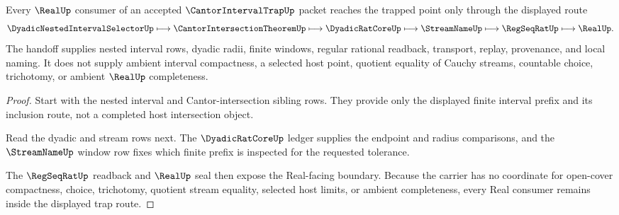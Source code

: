 \begin{theorem}
\label{thm:cantor-interval-trap-real-handoff}
Every $\RealUp$ consumer of an accepted $\CantorIntervalTrapUp$ packet reaches the trapped point only through the displayed route
$$
\DyadicNestedIntervalSelectorUp \longmapsto \CantorIntersectionTheoremUp \longmapsto \DyadicRatCoreUp \longmapsto \StreamNameUp \longmapsto \RegSeqRatUp \longmapsto \RealUp .
$$
The handoff supplies nested interval rows, dyadic radii, finite windows, regular rational readback, transport, replay, provenance, and local naming. It does not supply ambient interval compactness, a selected host point, quotient equality of Cauchy streams, countable choice, trichotomy, or ambient $\RealUp$ completeness.
\end{theorem}
\begin{proof}
Start with the nested interval and Cantor-intersection sibling rows. They provide only the displayed finite interval prefix and its inclusion route, not a completed host intersection object.

Read the dyadic and stream rows next. The $\DyadicRatCoreUp$ ledger supplies the endpoint and radius comparisons, and the $\StreamNameUp$ window row fixes which finite prefix is inspected for the requested tolerance.

The $\RegSeqRatUp$ readback and $\RealUp$ seal then expose the Real-facing boundary. Because the carrier has no coordinate for open-cover compactness, choice, trichotomy, quotient stream equality, selected host limits, or ambient completeness, every Real consumer remains inside the displayed trap route.
\end{proof}


\begin{closurestatus}{\CantorIntervalTrapUp}
  \theoryclosure{\seedClosure}
  \formalstatus{\unformalizedV}
\end{closurestatus}
